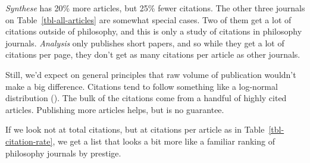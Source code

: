 \documentclass[
  10pt,
  letterpaper,
  DIV=11,
  numbers=noendperiod,
  twoside]{scrartcl}
\begin{document}
\emph{Synthese} has 20\% more articles, but 25\% fewer citations. The
other three journals on Table~\ref{tbl-all-articles} are somewhat
special cases. Two of them get a lot of citations outside of philosophy,
and this is only a study of citations in philosophy journals.
\emph{Analysis} only publishes short papers, and so while they get a lot
of citations per page, they don't get as many citations per article as
other journals.

Still, we'd expect on general principles that raw volume of publication
wouldn't make a big difference. Citations tend to follow something like
a log-normal distribution (). The bulk of the citations come from a handful of highly cited
articles. Publishing more articles helps, but is no guarantee.

If we look not at total citations, but at citations per article as in
Table~\ref{tbl-citation-rate}, we get a list that looks a bit more like
a familiar ranking of philosophy journals by prestige.
\end{document}
